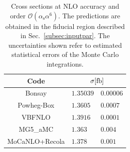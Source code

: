 \documentclass[twocolumn,epjc3]{svjour3} %
\newcommand{\alphas}{\ensuremath{\alpha_\text{s}}\xspace}
\begin{document}
    \begin{table}
        \centering
        \begin{tabular}{c|r@{ $\pm$ }l}
          Code  &  \multicolumn{2}{c}{$\sigma[\rm{fb}]$}  \\
            \hline
            \hline
            {\sc Bonsay}  &  $1.35039$ & $0.00006$  \\
            {\sc Powheg-Box}  &  $1.3605\phantom{0}$  & $0.0007$   \\
            {\sc VBFNLO}  &  $1.3916\phantom{0}$ & $0.0001$  \\
            {\sc MG5\_aMC}&  $1.363\phantom{0}\phantom{0}$ & $0.004$  \\
            {\sc MoCaNLO+Recola}  &  $ 1.378\phantom{0}\phantom{0}$ & $0.001$ 
        \end{tabular}
        \caption{\label{tab:wg1_NLOrates} Cross sections at NLO accuracy and order $\mathcal{O}(\alphas\alpha^6)$.
        The predictions are obtained in the fiducial region described in Sec.~\protect\ref{subsec:inputpar}.
        The uncertainties shown refer to estimated statistical errors of the Monte Carlo integrations.}
    \end{table}
\end{document}
